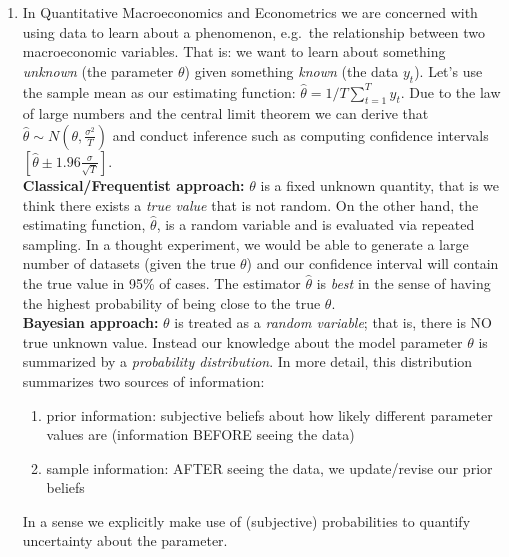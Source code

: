 \begin{enumerate}
\item In Quantitative Macroeconomics and Econometrics we are concerned with using data to learn about a phenomenon,
  e.g.\ the relationship between two macroeconomic variables.
That is: we want to learn about something \emph{unknown} (the parameter \(\theta \)) given something \emph{known} (the data \(y_t\)).
Let's use the sample mean as our estimating function:
\(\hat{\theta}=1/T \sum_{t=1}^T y_t\).
Due to the law of large numbers and the central limit theorem we can derive that
\(\hat{\theta}\sim N(\theta,\frac{\sigma^2}{T})\)
and conduct inference such as computing confidence intervals \([\hat{\theta}\pm 1.96 \frac{\sigma}{\sqrt{T}}]\).
\\
\textbf{Classical/Frequentist approach:} \(\theta \) is a fixed unknown quantity, that is we think there exists a \emph{true value} that is not random.
On the other hand, the estimating function, \(\hat{\theta}\), is a random variable and is evaluated via repeated sampling.
In a thought experiment, we would be able to generate a large number of datasets (given the true \(\theta \))
  and our confidence interval will contain the true value in 95\% of cases.
The estimator \(\hat{\theta}\) is \emph{best} in the sense of having the highest probability of being close to the true \(\theta \).
\\
\textbf{Bayesian approach:} \(\theta \) is treated as a \emph{random variable}; that is, there is NO true unknown value.
Instead our knowledge about the model parameter \(\theta \) is summarized by a \emph{probability distribution}.
In more detail, this distribution summarizes two sources of information:
\begin{enumerate}
\item prior information: subjective beliefs about how likely different parameter values are (information BEFORE seeing the data)
\item sample information: AFTER seeing the data, we update/revise our prior beliefs
\end{enumerate}
In a sense we explicitly make use of (subjective) probabilities to quantify uncertainty about the parameter.


\end{enumerate}
